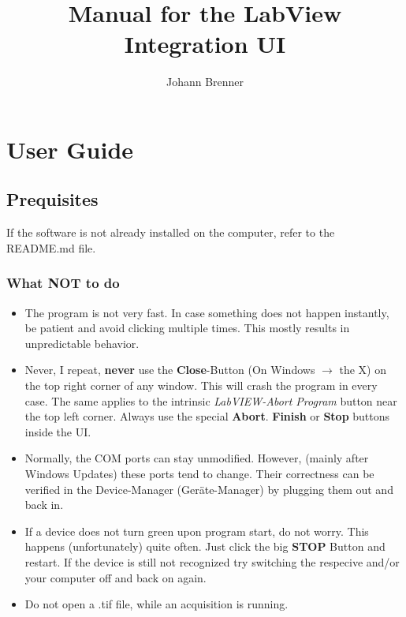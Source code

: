 \documentclass{article}
\title{Manual for the LabView Integration UI}
\author{Johann Brenner}
\begin{document}
	\maketitle
	\tableofcontents 



\section{User Guide}

\subsection{Prequisites}
	If the software is not already installed on the computer, refer to the README.md file.

\subsubsection*{What NOT to do}
\begin{itemize}
	\item	The program is not very fast. In case something does not happen instantly, be patient and avoid clicking multiple times. This mostly results in unpredictable behavior.
	\item Never, I repeat, \textbf{never} use the \textbf{Close}-Button (On Windows $\rightarrow$ the X) on the top right corner of any window. This will crash the program in every case. The same applies to the intrinsic \textit{LabVIEW-Abort Program} button near the top left corner. Always use the special \textbf{Abort}. \textbf{Finish} or \textbf{Stop} buttons inside the UI.
	\item Normally, the COM ports can stay unmodified. However, (mainly after Windows Updates) these ports tend to change. Their correctness can be verified in the Device-Manager (Geräte-Manager) by plugging them out and back in.
	\item If a device does not turn green upon program start, do not worry. This happens (unfortunately) quite often. Just click the big \textbf{STOP} Button and restart. If the device is still not recognized try switching the respecive and/or your computer off and back on again.
	\item Do not open a .tif file, while an acquisition is running. 
\end{itemize}
\end{document}
